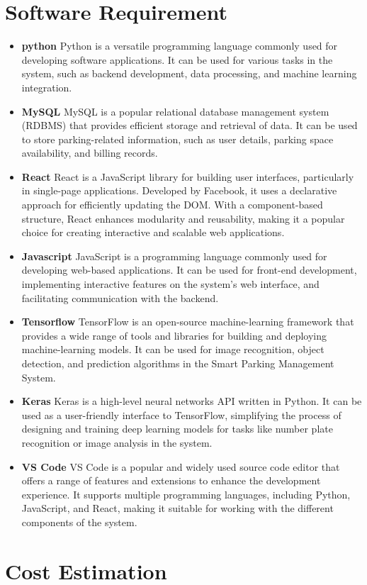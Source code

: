 \section{Software Requirement}
\begin{itemize}[noitemsep]
\item \textbf{python} 
Python is a versatile programming language commonly used for developing software applications. It can be used for various tasks in the system, such as backend development, data processing, and machine learning integration.
\item \textbf{MySQL}
MySQL is a popular relational database management system (RDBMS) that provides efficient storage and retrieval of data. It can be used to store parking-related information, such as user details, parking space availability, and billing records. 
\item \textbf{React }
 React is a JavaScript library for building user interfaces, particularly in single-page applications. Developed by Facebook, it uses a declarative approach for efficiently updating the DOM. With a component-based structure, React enhances modularity and reusability, making it a popular choice for creating interactive and scalable web applications.
\item \textbf{Javascript }
JavaScript is a programming language commonly used for developing web-based applications. It can be used for front-end development, implementing interactive features on the system’s web interface, and facilitating communication with the backend. 
\item \textbf{Tensorflow }
TensorFlow is an open-source machine-learning framework that provides a wide range of tools and libraries for building and deploying machine-learning models. It can be used for image recognition, object detection, and prediction algorithms in the Smart Parking Management System.
\item \textbf{Keras}
Keras is a high-level neural networks API written in Python. It can be used as a user-friendly interface to TensorFlow, simplifying the process of designing and training deep learning models for tasks like number plate recognition or image analysis in the system.
\item \textbf{VS Code}
VS Code is a popular and widely used source code editor that offers a range of features and extensions to enhance the development experience. It supports multiple programming languages, including Python, JavaScript, and React, making it suitable for working with the different components of the system. 
\end{itemize}
\section{Cost Estimation}
